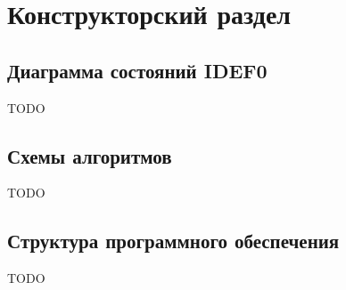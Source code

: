 \chapter{Конструкторский раздел}

\section{Диаграмма состояний IDEF0}

TODO

\section{Схемы алгоритмов}

TODO

\section{Структура программного обеспечения}

TODO
